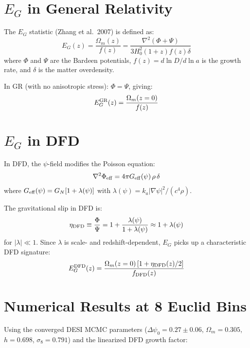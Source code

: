 \documentclass[11pt,a4paper]{article}
\begin{document}
\section{$E_G$ in General Relativity}

The $E_G$ statistic (Zhang et al.\ 2007) is defined as:
\begin{equation}
E_G(z) = \frac{\Omega_m(z)}{f(z)} = \frac{\nabla^2(\Phi + \Psi)}{3 H_0^2 (1+z) f(z) \delta}
\end{equation}
where $\Phi$ and $\Psi$ are the Bardeen potentials, $f(z) = d\ln D/d\ln a$ is the growth rate, and $\delta$ is the matter overdensity.

In GR (with no anisotropic stress): $\Phi = \Psi$, giving:
\begin{equation}
E_G^{\rm GR}(z) = \frac{\Omega_m(z=0)}{f(z)}
\end{equation}

\section{$E_G$ in DFD}

In DFD, the $\psi$-field modifies the Poisson equation:
\begin{equation}
\nabla^2 \Phi_{\rm eff} = 4\pi G_{\rm eff}(\psi) \, \rho \, \delta
\end{equation}
where $G_{\rm eff}(\psi) = G_N [1 + \lambda(\psi)]$ with $\lambda(\psi) = k_a |\nabla \psi|^2 / (c^4 \rho)$.

The gravitational slip in DFD is:
\begin{equation}
\eta_{\rm DFD} \equiv \frac{\Phi}{\Psi} = 1 + \frac{\lambda(\psi)}{1 + \lambda(\psi)} \approx 1 + \lambda(\psi)
\end{equation}
for $|\lambda| \ll 1$. Since $\lambda$ is scale- and redshift-dependent, $E_G$ picks up a characteristic DFD signature:
\begin{equation}
E_G^{\rm DFD}(z) = \frac{\Omega_m(z=0) \, [1 + \eta_{\rm DFD}(z)/2]}{f_{\rm DFD}(z)}
\end{equation}

\section{Numerical Results at 8 Euclid Bins}

Using the converged DESI MCMC parameters ($\Delta\psi_0 = 0.27 \pm 0.06$, $\Omega_m = 0.305$, $h = 0.698$, $\sigma_8 = 0.791$) and the linearized DFD growth factor:
\end{document}
